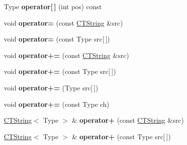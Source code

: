 \begin{DoxyCompactItemize}
\item 
\hypertarget{classps_1_1base_1_1CTString_a2c0f07a533f8ca9b5d2fa086132d4fe6}{}Type {\bfseries operator\mbox{[}$\,$\mbox{]}} (int pos) const \label{classps_1_1base_1_1CTString_a2c0f07a533f8ca9b5d2fa086132d4fe6}

\item 
\hypertarget{classps_1_1base_1_1CTString_adf707a1cef80754597c9c6cab8165870}{}void {\bfseries operator=} (const \hyperlink{classps_1_1base_1_1CTString}{C\+T\+String} \&src)\label{classps_1_1base_1_1CTString_adf707a1cef80754597c9c6cab8165870}

\item 
\hypertarget{classps_1_1base_1_1CTString_acddc028d7a5d157e93aa2d600aa43c07}{}void {\bfseries operator=} (const Type src\mbox{[}$\,$\mbox{]})\label{classps_1_1base_1_1CTString_acddc028d7a5d157e93aa2d600aa43c07}

\item 
\hypertarget{classps_1_1base_1_1CTString_a985b8ae1204967b0daf8a92f910c95a4}{}void {\bfseries operator+=} (const \hyperlink{classps_1_1base_1_1CTString}{C\+T\+String} \&src)\label{classps_1_1base_1_1CTString_a985b8ae1204967b0daf8a92f910c95a4}

\item 
\hypertarget{classps_1_1base_1_1CTString_adda8324c2a60768de0953739d9177eee}{}void {\bfseries operator+=} (const Type src\mbox{[}$\,$\mbox{]})\label{classps_1_1base_1_1CTString_adda8324c2a60768de0953739d9177eee}

\item 
\hypertarget{classps_1_1base_1_1CTString_a1eabf649323615b7f2cabfe0c34015e7}{}void {\bfseries operator+=} (Type src\mbox{[}$\,$\mbox{]})\label{classps_1_1base_1_1CTString_a1eabf649323615b7f2cabfe0c34015e7}

\item 
\hypertarget{classps_1_1base_1_1CTString_ab869a06f6b73904dd4dd0bce3f174f0b}{}void {\bfseries operator+=} (const Type ch)\label{classps_1_1base_1_1CTString_ab869a06f6b73904dd4dd0bce3f174f0b}

\item 
\hypertarget{classps_1_1base_1_1CTString_a561a41613ae4990673279b3b6211a9df}{}\hyperlink{classps_1_1base_1_1CTString}{C\+T\+String}$<$ Type $>$ \& {\bfseries operator+} (const \hyperlink{classps_1_1base_1_1CTString}{C\+T\+String} \&src)\label{classps_1_1base_1_1CTString_a561a41613ae4990673279b3b6211a9df}

\item 
\hypertarget{classps_1_1base_1_1CTString_ae529fa673a40133710cc568dcfa457c7}{}\hyperlink{classps_1_1base_1_1CTString}{C\+T\+String}$<$ Type $>$ \& {\bfseries operator+} (const Type src\mbox{[}$\,$\mbox{]})\label{classps_1_1base_1_1CTString_ae529fa673a40133710cc568dcfa457c7}


\end{DoxyCompactItemize}
